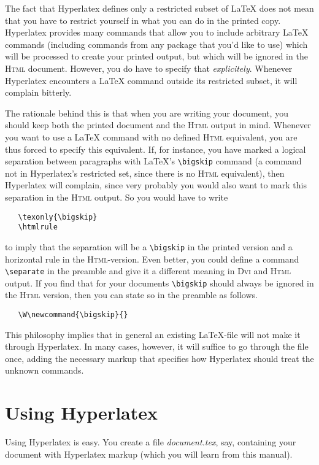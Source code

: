 \documentclass[a4paper]{article}
\newcommand{\+}{\verb+}
\renewcommand{\=}{\back{}}
\newcommand{\Html}{\textsc{Html}\xspace }
\newcommand{\latex}{\LaTeX\xspace }
\newcommand{\dvi}{\textsc{Dvi}\xspace }
\begin{document}
The fact that Hyperlatex defines only a restricted subset of \latex
does not mean that you have to restrict yourself in what you can do in
the printed copy. Hyperlatex provides many commands that allow you to
include arbitrary \latex commands (including commands from any package
that you'd like to use) which will be processed to create your printed
output, but which will be ignored in the \Html document.  However, you
do have to specify that \emph{explicitely}. Whenever Hyperlatex
encounters a \latex command outside its restricted subset, it will
complain bitterly.

The rationale behind this is that when you are writing your document,
you should keep both the printed document and the \Html output in
mind.  Whenever you want to use a \latex command with no defined \Html
equivalent, you are thus forced to specify this equivalent.  If, for
instance, you have marked a logical separation between paragraphs with
\latex's \verb+\bigskip+ command (a command not in Hyperlatex's
restricted set, since there is no \Html equivalent), then Hyperlatex
will complain, since very probably you would also want to mark this
separation in the \Html output. So you would have to write
\begin{verbatim}
   \texonly{\bigskip}
   \htmlrule
\end{verbatim}
to imply that the separation will be a \verb+\bigskip+ in the printed
version and a horizontal rule in the \Html-version.  Even better, you
could define a command \verb+\separate+ in the preamble and give it a
different meaning in \dvi and \Html output. If you find that for your
documents \verb+\bigskip+ should always be ignored in the \Html
version, then you can state so in the preamble as follows.
\begin{verbatim}
   \W\newcommand{\bigskip}{}
\end{verbatim}

This philosophy implies that in general an existing \latex-file will
not make it through Hyperlatex. In many cases, however, it will
suffice to go through the file once, adding the necessary markup that
specifies how Hyperlatex should treat the unknown commands.

\section{Using Hyperlatex}
\label{sec:using-hyperlatex}

Using Hyperlatex is easy. You create a file \textit{document.tex},
say, containing your document with Hyperlatex markup (which you will
learn from this manual).
\end{document}
